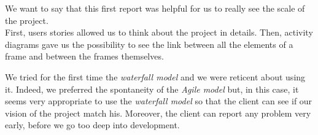 We want to say that this first report was helpful for us to really see the scale of the project.\\


First, users stories allowed us to think about the project in details.
Then, activity diagrams gave us the possibility to see the link between all the elements of a frame and between the frames themselves.


We tried for the first time the \emph{waterfall model} and we were reticent about using it. Indeed, we preferred the spontaneity of the \emph{Agile model} but, in this case, it seems very appropriate to use the \emph{waterfall model} so that the client can see if our vision of the project match his. Moreover, the client can report any problem very early, before we go too deep into development.